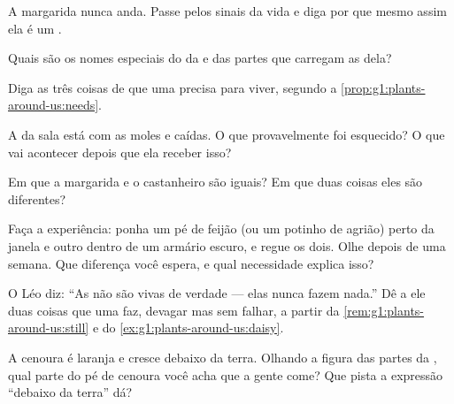 \begin{exercise}[$\star$]\label{exo:g1:plants-around-us:3}
A margarida nunca anda. Passe pelos sinais da vida e diga por que
mesmo assim ela é um .
\end{exercise}

\begin{exercise}[$\star$]\label{exo:g1:plants-around-us:4}
Quais são os nomes especiais do  da  e das partes que
carregam as  dela?
\end{exercise}

\begin{exercise}[$\star$]\label{exo:g1:plants-around-us:5}
Diga as três coisas de que uma  precisa para viver, segundo a
\cref{prop:g1:plants-around-us:needs}.
\end{exercise}

\begin{exercise}[$\star$]\label{exo:g1:plants-around-us:6}
A  da sala está com as  moles e caídas. O que
provavelmente foi esquecido? O que vai acontecer depois que ela
receber isso?
\end{exercise}

\begin{exercise}[$\star$]\label{exo:g1:plants-around-us:7}
Em que a margarida e o castanheiro são iguais? Em que duas coisas
eles são diferentes?
\end{exercise}

\begin{exercise}[$\star$]\label{exo:g1:plants-around-us:8}
Faça a experiência: ponha um pé de feijão (ou um potinho de agrião)
perto da janela e outro dentro de um armário escuro, e regue os
dois. Olhe depois de uma semana. Que diferença você espera, e qual
necessidade explica isso?
\end{exercise}

\begin{exercise}[$\star\star$]\label{exo:g1:plants-around-us:9}
O Léo diz: ``As  não são vivas de verdade --- elas nunca
fazem nada.'' Dê a ele duas coisas que uma  faz, devagar mas
sem falhar, a partir da \cref{rem:g1:plants-around-us:still} e do
\cref{ex:g1:plants-around-us:daisy}.
\end{exercise}

\begin{exercise}[$\star\star$]\label{exo:g1:plants-around-us:10}
A cenoura é laranja e cresce debaixo da terra. Olhando a figura das
partes da , qual parte do pé de cenoura você acha que a gente
come? Que pista a expressão ``debaixo da terra'' dá?
\end{exercise}
